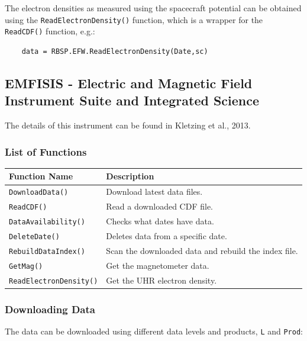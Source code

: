 	The electron densities as measured using the spacecraft potential can be obtained using the \texttt{ReadElectronDensity()} function, which is a wrapper for the \texttt{ReadCDF()} function, e.g.:
	
	\begin{verbatim}
	data = RBSP.EFW.ReadElectronDensity(Date,sc)
	\end{verbatim}
	
	\subsection{EMFISIS - Electric and Magnetic Field Instrument Suite and Integrated Science}
	
	The details of this instrument can be found in Kletzing et al., 2013.
	
	\subsubsection{List of Functions}
	
	\begin{tabular}{|l|l|}
	\hline
	Function Name & Description \\
	\hline
	\texttt{DownloadData()} & Download latest data files. \\
	\texttt{ReadCDF()} & Read a downloaded CDF file. \\
	\texttt{DataAvailability()} & Checks what dates have data. \\
	\texttt{DeleteDate()} & Deletes data from a specific date. \\
	\texttt{RebuildDataIndex()} & Scan the downloaded data and rebuild the index file. \\
	\texttt{GetMag()} & Get the magnetometer data. \\
	\texttt{ReadElectronDensity()} & Get the UHR electron density. \\
	\hline
	\end{tabular}
	
	\subsubsection{Downloading Data}
	
	The data can be downloaded using different data levels and products, \texttt{L} and \texttt{Prod}:
	

